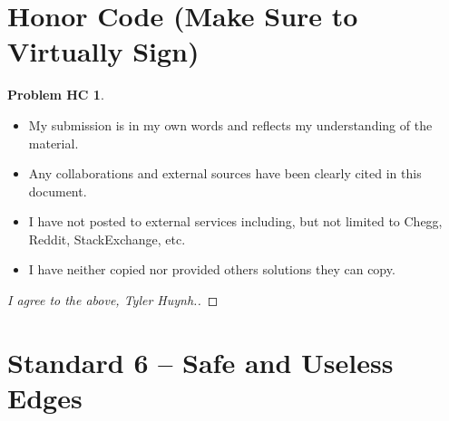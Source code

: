 \documentclass[11pt]{article}
\theoremstyle{definition}
\theoremstyle{definition}
\newtheorem*{requiredHC}{Problem HC}
\theoremstyle{definition}
\begin{document}
\section*{Honor Code (Make Sure to Virtually Sign)} \label{HonorCode}
\hypertarget{HonorCode}{}

\begin{requiredHC}
\begin{itemize}
\item My submission is in my own words and reflects my understanding of the material.
\item Any collaborations and external sources have been clearly cited in this document.
\item I have not posted to external services including, but not limited to Chegg, Reddit, StackExchange, etc.
\item I have neither copied nor provided others solutions they can copy.
\end{itemize}

\end{requiredHC}

\begin{proof}[I agree to the above, Tyler Huynh.]
\end{proof}


\newpage
\setcounter{section}{5}
\section{Standard 6 -- Safe and Useless Edges}
\end{document}
